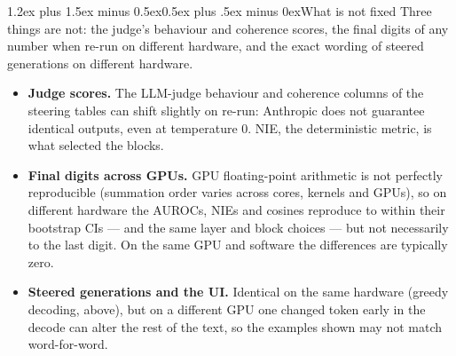 \documentclass[conference]{IEEEtran}
\makeatletter
\renewcommand{\subsection}{\@startsection{subsection}{2}{\z@}%
  {1.2ex plus 1.5ex minus 0.5ex}{0.5ex plus .5ex minus 0ex}{\normalfont\normalsize\itshape}}
\makeatother
\begin{document}
\subsection{What is not fixed}
Three things are not: the judge's behaviour and coherence scores, the final digits of any
number when re-run on different hardware, and the exact wording of steered generations on
different hardware.
\begin{itemize}
\item \textbf{Judge scores.} The LLM-judge behaviour and coherence columns of the steering tables
  can shift slightly on re-run: Anthropic does not guarantee identical outputs, even at
  temperature 0. NIE, the deterministic metric, is what selected the blocks.
\item \textbf{Final digits across GPUs.} GPU floating-point arithmetic is not perfectly
  reproducible (summation order varies across cores, kernels and GPUs), so on different hardware
  the AUROCs, NIEs and cosines reproduce to within their bootstrap CIs --- and the same layer and
  block choices --- but not necessarily to the last digit. On the same GPU and software the
  differences are typically zero.
\item \textbf{Steered generations and the UI.} Identical on the same hardware (greedy decoding,
  above), but on a different GPU one changed token early in the decode can alter the rest of the
  text, so the examples shown may not match word-for-word.
\end{itemize}
\end{document}
